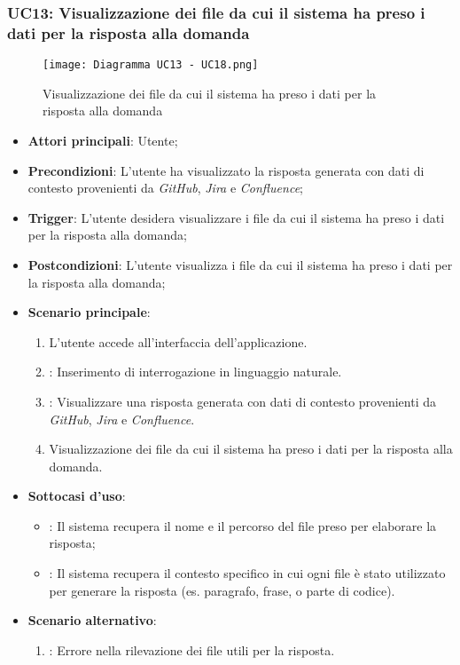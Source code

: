 \newpage
\hypertarget{UC13}{}
\subsubsection{UC13: Visualizzazione dei file da cui il sistema ha preso i dati per la risposta alla domanda}

\begin{figure}[h]
    \centering
    \texttt{[image: Diagramma UC13 - UC18.png]}
    \caption{Visualizzazione dei file da cui il sistema ha preso i dati per la risposta alla domanda}
\end{figure}

\begin{itemize}
    \item \textbf{Attori principali}: Utente;
    \item \textbf{Precondizioni}: L'utente ha visualizzato la risposta generata con dati di contesto provenienti da \emph{GitHub}, \emph{Jira} e \emph{Confluence};
    \item \textbf{Trigger}: L'utente desidera visualizzare i file da cui il sistema ha preso i dati per la risposta alla domanda;
    \item \textbf{Postcondizioni}: L'utente visualizza i file da cui il sistema ha preso i dati per la risposta alla domanda;
    \item \textbf{Scenario principale}:
    \begin{enumerate}
        \item L'utente accede all'interfaccia dell'applicazione.
        \item {}: Inserimento di interrogazione in linguaggio naturale.
        \item {}: Visualizzare una risposta generata con dati di contesto provenienti da \emph{GitHub}, \emph{Jira} e \emph{Confluence}.
        \item Visualizzazione dei file da cui il sistema ha preso i dati per la risposta alla domanda.
    \end{enumerate}
    \item \textbf{Sottocasi d'uso}:
    \begin{itemize}
        \item {}: Il sistema recupera il nome e il percorso del file preso per elaborare la risposta;
        \item {}: Il sistema recupera il contesto specifico in cui ogni file è stato utilizzato
        per generare la risposta (es. paragrafo, frase, o parte di codice).
    \end{itemize}
    \item \textbf{Scenario alternativo}:
    \begin{enumerate}
        \item {}: Errore nella rilevazione dei file utili per la risposta.
    \end{enumerate}
\end{itemize}


